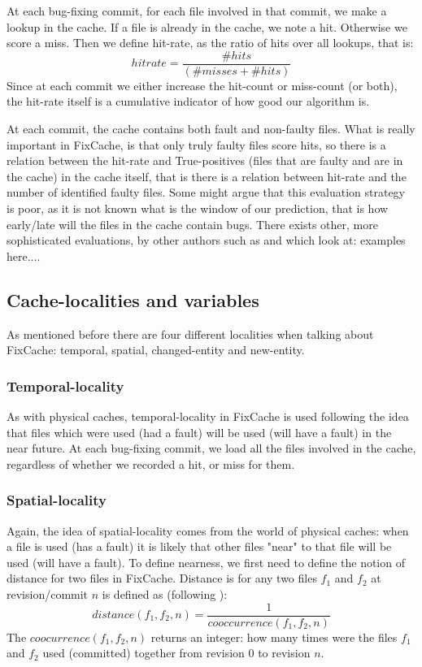 \documentclass[12pt,twoside,notitlepage]{report}
\newcommand{\fxch}{FixCache}
\begin{document}
At each bug-fixing commit, for each file involved in that commit, we make a lookup in the cache. If a file is already in the cache, we note a hit. Otherwise we score a miss. Then we define hit-rate, as the ratio of hits over all lookups, that is:
\[
	hitrate = \frac{\#hits}{(\#misses + \#hits)}
\]
Since at each commit we either increase the hit-count or miss-count (or both), the hit-rate itself is a cumulative indicator of how good our algorithm is. 

At each commit, the cache contains both fault and non-faulty files. What is really important in \fxch{}, is that only truly faulty files score hits, so there is a relation between the hit-rate and True-positives (files that are faulty and are in the cache) in the cache itself, that is there is a relation between hit-rate and the number of identified faulty files. Some might argue that this evaluation strategy is poor, as it is not known what is the window of our prediction, that is how early/late will the files in the cache contain bugs. There exists other, more sophisticated evaluations, by other authors such as \cite{Sadowski} and \cite{Bugcache} which look at: examples here....
\subsection{Cache-localities and variables}\label{variables}
As mentioned before there are four different localities when talking about \fxch{}: temporal, spatial, changed-entity and new-entity. 
\subsubsection{Temporal-locality}
As with physical caches, temporal-locality in \fxch{} is used following the idea that files which were used (had a fault) will be used (will have a fault) in the near future. At each bug-fixing commit, we load all the files involved in the cache, regardless of whether we recorded a hit, or miss for them.
\subsubsection{Spatial-locality}
Again, the idea of spatial-locality comes from the world of physical caches: when a file is used (has a fault) it is likely that other files "near" to that file will be used (will have a fault). To define nearness, we first need to define the notion of distance for two files in \fxch{}. Distance is for any two files $f_1$ and $f_2$ at revision/commit $n$ is defined as (following \cite{FixCache}):
\[
	distance(f_1, f_2, n) = \frac{1}{cooccurrence(f_1, f_2, n)}
\]
The $coocurrence(f_1, f_2, n)$ returns an integer: how many times were the files $f_1$ and $f_2$ used (committed) together from revision $0$ to revision $n$.
\end{document}
